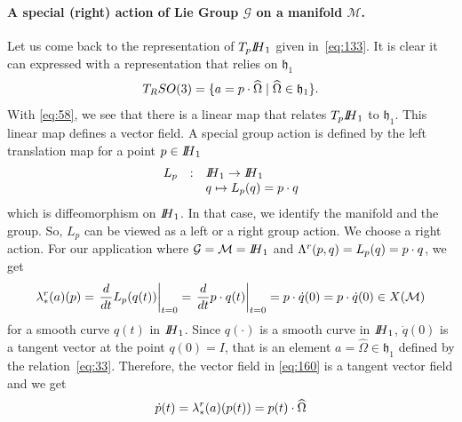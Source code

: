 \paragraph{ A special  (right)  action of Lie Group $\mathcal G$ on a manifold $\mathcal M$. }
Let us come back to the representation of  $T_p\mbox{\rm $I\!\!H$}_1$ given in~\eqref{eq:133}. It is clear it can expressed with a representation that relies on $\mathfrak h_1$
\begin{equation}
  \label{eq:158}
   T_RSO(3) = \{ a = p \cdot  \widehat \Omega \mid \widehat \Omega \in \mathfrak h_1 \}.
\end{equation}
With \eqref{eq:58}, we see that there is a linear map that relates $T_p\mbox{\rm $I\!\!H$}_1$ to  $\mathfrak h_1$. This linear map defines a vector field.
A special group action is defined by the left translation map for a point $p \in \mbox{\rm $I\!\!H$}_1$
\begin{equation}
  \label{eq:159}
  \begin{array}[lcl]{rcl}
    L_p& :&   \HH_1 \rightarrow  \HH_1\\
       & &  q  \mapsto L_p(q) = p \glaw q\\
  \end{array}
\end{equation}
which is diffeomorphism on $\mbox{\rm $I\!\!H$}_1$. In that case, we identify the manifold and the group. So, $L_p$ can be viewed as a left or a right group action. We choose a right action. For our application where $\mathcal G = \mathcal M = \mbox{\rm $I\!\!H$}_1$ and $\Lambda^r(p,q) = L_{p}(q) =  p \cdot q $, we get
\begin{equation}
  \label{eq:160}
   \lambda^r_{*}(a)(p) = \left. \frac{d}{dt} L_{p}(q(t)) \right|_{t=0}  = \left. \frac{d}{dt} p \cdot q(t) \right|_{t=0} =  p \cdot \dot q(0) = p  \cdot \dot q(0)  \in X(\mathcal M)
 \end{equation}
 for a smooth curve $q(t)$ in $\mbox{\rm $I\!\!H$}_1$.
Since $q(\cdot)$ is a smooth curve in $\mbox{\rm $I\!\!H$}_1$, $\dot q(0)$ is a tangent vector at the point $q(0)=I$, that is an element $a = \widehat  \Omega  \in \mathfrak h_1 $ defined by the relation~\eqref{eq:33}. Therefore, the vector field in \eqref{eq:160} is a tangent vector field and we get
\begin{equation}
  \label{eq:161}
  \dot p(t) = \lambda^r_{*}(a)(p(t)) = p(t)  \cdot \widehat \Omega
\end{equation}

